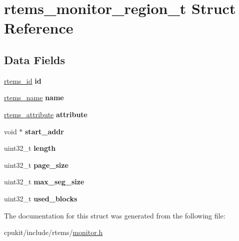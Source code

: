 \hypertarget{structrtems__monitor__region__t}{}\section{rtems\+\_\+monitor\+\_\+region\+\_\+t Struct Reference}
\label{structrtems__monitor__region__t}
\subsection*{Data Fields}
\begin{DoxyCompactItemize}
\item 
\mbox{\label{structrtems__monitor__region__t_a9f37e8eb24b04e50eeb18fdaa2b3b43e}} 
\mbox{\hyperlink{group__ClassicTasks_gab20892b814dced7dd4e5b9bf42becd57}{rtems\+\_\+id}} {\bfseries id}
\item 
\mbox{\label{structrtems__monitor__region__t_af847209f99b587f939c3d9b4df08a239}} 
\mbox{\hyperlink{group__ClassicTasks_ga55fb63c49f68c0cbd9bee004da15b1fd}{rtems\+\_\+name}} {\bfseries name}
\item 
\mbox{\label{structrtems__monitor__region__t_aba53cd0aefebe92a77767a973d3f4767}} 
\mbox{\hyperlink{group__ClassicAttributes_gaea40313cf78ed843e09c4315d0a10f79}{rtems\+\_\+attribute}} {\bfseries attribute}
\item 
\mbox{\label{structrtems__monitor__region__t_a03c4ca34196755718608dc17731d3e60}} 
void $\ast$ {\bfseries start\+\_\+addr}
\item 
\mbox{\label{structrtems__monitor__region__t_a7448a201829afc0b06cb1acc5ee9d0f9}} 
uint32\+\_\+t {\bfseries length}
\item 
\mbox{\label{structrtems__monitor__region__t_aede616ccba7e9a1054be3e31cb9e779b}} 
uint32\+\_\+t {\bfseries page\+\_\+size}
\item 
\mbox{\label{structrtems__monitor__region__t_ac82de34c502f179e33238f87e922fcb6}} 
uint32\+\_\+t {\bfseries max\+\_\+seg\+\_\+size}
\item 
\mbox{\label{structrtems__monitor__region__t_a46dc41f617de1ce5e2c61f8aee831f00}} 
uint32\+\_\+t {\bfseries used\+\_\+blocks}
\end{DoxyCompactItemize}


The documentation for this struct was generated from the following file\+:\begin{DoxyCompactItemize}
\item 
cpukit/include/rtems/\mbox{\hyperlink{monitor_8h}{monitor.\+h}}\end{DoxyCompactItemize}
